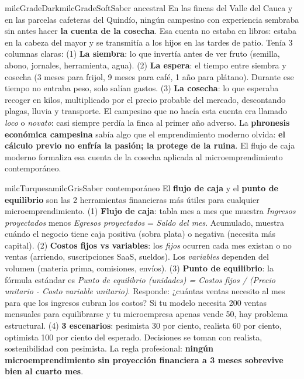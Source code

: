 \documentclass[11pt,letterpaper]{article}
\begin{document}
\begin{softbox}{milcGradeDark}{milcGradeSoft}{Saber ancestral}
En las fincas del Valle del Cauca y en las parcelas cafeteras del Quindío, ningún campesino con experiencia sembraba sin antes hacer \textbf{la cuenta de la cosecha}. Esa cuenta no estaba en libros: estaba en la cabeza del mayor y se transmitía a los hijos en las tardes de patio. Tenía 3 columnas claras: (1) \textbf{La siembra}: lo que invertía antes de ver fruto (semilla, abono, jornales, herramienta, agua). (2) \textbf{La espera}: el tiempo entre siembra y cosecha (3 meses para frijol, 9 meses para café, 1 año para plátano). Durante ese tiempo no entraba peso, solo salían gastos. (3) \textbf{La cosecha}: lo que esperaba recoger en kilos, multiplicado por el precio probable del mercado, descontando plagas, lluvia y transporte. El campesino que no hacía esta cuenta era llamado \emph{loco} o \emph{novato}: casi siempre perdía la finca al primer año adverso. La \textbf{phronesis económica campesina} sabía algo que el emprendimiento moderno olvida: \textbf{el cálculo previo no enfría la pasión; la protege de la ruina}. El flujo de caja moderno formaliza esa cuenta de la cosecha aplicada al microemprendimiento contemporáneo.
\end{softbox}

\begin{softbox}{milcTurquesa}{milcGris}{Saber contemporáneo}
El \textbf{flujo de caja} y el \textbf{punto de equilibrio} son las 2 herramientas financieras más útiles para cualquier microemprendimiento. (1) \textbf{Flujo de caja}: tabla mes a mes que muestra \emph{Ingresos proyectados} menos \emph{Egresos proyectados} = \emph{Saldo del mes}. Acumulado, muestra cuándo el negocio tiene caja positiva (sobra plata) o negativa (necesita más capital). (2) \textbf{Costos fijos vs variables}: los \emph{fijos} ocurren cada mes existan o no ventas (arriendo, suscripciones SaaS, sueldos). Los \emph{variables} dependen del volumen (materia prima, comisiones, envíos). (3) \textbf{Punto de equilibrio}: la fórmula estándar es \emph{Punto de equilibrio (unidades) = Costos fijos / (Precio unitario - Costo variable unitario)}. Responde: ¿cuántas ventas necesito al mes para que los ingresos cubran los costos? Si tu modelo necesita 200 ventas mensuales para equilibrarse y tu microempresa apenas vende 50, hay problema estructural. (4) \textbf{3 escenarios}: pesimista 30 por ciento, realista 60 por ciento, optimista 100 por ciento del esperado. Decisiones se toman con realista, sostenibilidad con pesimista. La regla profesional: \textbf{ningún microemprendimiento sin proyección financiera a 3 meses sobrevive bien al cuarto mes}.
\end{softbox}
\end{document}
